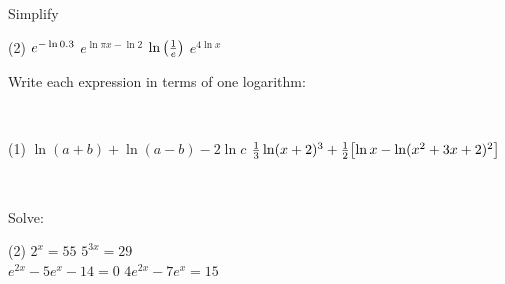 \documentclass[answers]{exam}
\begin{document}
  \begin{ex*}
    Simplify
  \end{ex*}
  \begin{extasks}[after-item-skip=\stretch{1}](2)
    \task $e\inv[\ln 0.3]$
    \task $e^{\ln \pi x-\ln 2}$
    \task $\ln\parens{\frac{1}{e}}$
    \task $e^{4\ln x}$
  \end{extasks}

  \pagebreak
  \begin{ex*}
    Write each expression in terms of one logarithm:
    
    \noindent
    \begin{minipage}[t]{0.55\linewidth}~
      \begin{extasks}[after-item-skip=2.25in](1)
        \task $\ln(a+b)+\ln(a-b)-2\ln c$
        \task $\frac{1}{3}\ln(x+2)^3 +\frac{1}{2}\sbrkt{\ln x-\ln(x^2+3x+2)^2}$
      \end{extasks}
    \end{minipage}%
    \begin{minipage}[t]{0.45\linewidth}~
      \begin{flushright}
      \end{flushright}
    \end{minipage}
  \end{ex*}
  \begin{center}
  \end{center}
  \pagebreak
  \begin{ex*}
    Solve:
    \begin{extasks}(2)
      \task $2^x=55$
      \task $5^{3x}=29$\\[40pt]
      \task $e^{2x}-5e^x-14=0$
      \task $4e^{2x}-7e^x=15$\\[40pt]
    \end{extasks}
  \end{ex*}
\end{document}
